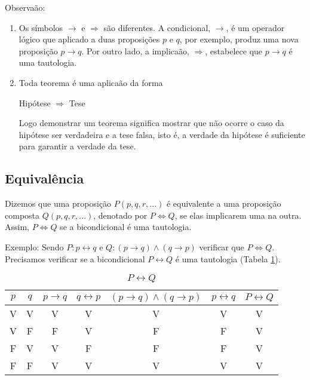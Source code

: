 Observaão:
\begin{enumerate}
\item Os símbolos $\rightarrow$ e $\Rightarrow$ são diferentes. A condicional, $\rightarrow$, é um operador lógico que aplicado a duas proposições $p$ e $q$, por exemplo, produz uma nova proposição $p\rightarrow q$. Por outro lado, a implicaão, $\Rightarrow$, estabelece que $p\rightarrow q$ é uma tautologia.
\item Toda teorema é uma aplicaão da forma
\begin{center}
Hipótese $\Rightarrow$ Tese
\end{center}

Logo demonstrar um teorema significa mostrar que não ocorre o caso da hipótese ser verdadeira e a tese falsa, isto é, a verdade da hipótese é suficiente para garantir a verdade da tese.
\end{enumerate}

\subsection{Equivalência}

\begin{definicao}[Equivalência] Dizemos que uma proposição $P(p,q,r,...)$ é equivalente a uma proposição composta $Q(p,q,r,...)$, denotado por $P\Leftrightarrow Q$, se elas implicarem uma na outra. Assim, $P\Leftrightarrow Q$ se a bicondicional é uma tautologia.\end{definicao}

Exemplo: Sendo $P:p\leftrightarrow q$ e $Q:(p\rightarrow q)\wedge(q\rightarrow p)$ verificar que $P\Leftrightarrow Q$.\\

Precisamos verificar se a bicondicional $P\leftrightarrow Q$ é uma tautologia (Tabela \ref{4}).
\begin{table}[h]
   \centering
   \setlength{\arrayrulewidth}{0,5\arrayrulewidth}
   \caption{\it $P\leftrightarrow Q$}
   \begin{tabular}{|c|c|c|c|c|c|c|}
      \hline
      $p$ & $q$ & $p\rightarrow q$ & $q\leftrightarrow p$ & $(p\rightarrow q)\wedge(q\rightarrow p)$ & $p\leftrightarrow q$ & $P\leftrightarrow Q$ \\
     \hline
      V & V & V & V & V & V & V \\
      \hline
      V & F & F & V & F & F & V\\
      \hline
      F & V & V & F & F & F & V \\
      \hline
      F & F & V & V & V & V & V \\
      \hline
   \end{tabular}
\label{4}
\end{table}